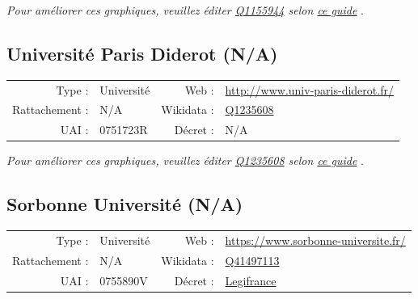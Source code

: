 \documentclass[12pt,french,landscape]{article}
\begin{document}
\textit{\scriptsize Pour améliorer ces graphiques, veuillez éditer \href{https://www.wikidata.org/entity/Q1155944}{Q1155944}  selon \href{https://github.com/cpesr/wikidataESR/blob/master/Rmd/wikidataESR.md}{ce guide}}
.


\newpage

\hypertarget{universituxe9-paris-diderot-na}{%
\subsection{Université Paris Diderot
(N/A)}\label{universituxe9-paris-diderot-na}}

\begin{tabular*}{0.45\textwidth}{rp{2cm}rl}  
\hline  
Type : & Université & Web : &\href{http://www.univ-paris-diderot.fr/}{http://www.univ-paris-diderot.fr/} \\  
Rattachement : & N/A & Wikidata : & \href{https://www.wikidata.org/entity/Q1235608}{Q1235608} \\  
UAI : & 0751723R & Décret : & N/A \\  
\hline  
\end{tabular*}

\textit{\scriptsize Pour améliorer ces graphiques, veuillez éditer \href{https://www.wikidata.org/entity/Q1235608}{Q1235608}  selon \href{https://github.com/cpesr/wikidataESR/blob/master/Rmd/wikidataESR.md}{ce guide}}
.


\newpage

\hypertarget{sorbonne-universituxe9-na}{%
\subsection{Sorbonne Université (N/A)}\label{sorbonne-universituxe9-na}}

\begin{tabular*}{0.45\textwidth}{rp{2cm}rl}  
\hline  
Type : & Université & Web : &\href{https://www.sorbonne-universite.fr/}{https://www.sorbonne-universite.fr/} \\  
Rattachement : & N/A & Wikidata : & \href{https://www.wikidata.org/entity/Q41497113}{Q41497113} \\  
UAI : & 0755890V & Décret : & \href{https://www.legifrance.gouv.fr/affichTexte.do?cidTexte=JORFTEXT000034455357&categorieLien=id}{Legifrance} \\  
\hline  
\end{tabular*}
\end{document}
